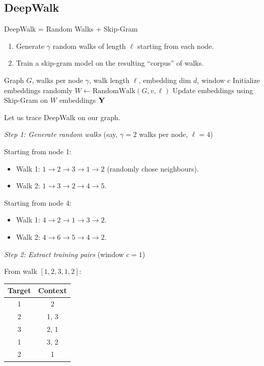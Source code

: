 \begin{notechapter}
\subsection{DeepWalk}

\begin{definition}[DeepWalk]
DeepWalk = Random Walks + Skip-Gram
\begin{enumerate}
    \item Generate $\gamma$ random walks of length $\ell$ starting from each node.
    \item Train a skip-gram model on the resulting ``corpus'' of walks.
\end{enumerate}
\end{definition}

\begin{algorithm}
\caption{DeepWalk}
\begin{algorithmic}[1]
\Require Graph $G$, walks per node $\gamma$, walk length $\ell$, embedding dim $d$, window $c$
\State Initialize embeddings randomly
        \State $W \gets \text{RandomWalk}(G, v, \ell)$ 
        \State Update embeddings using Skip-Gram on $W$
    \EndFor
\EndFor
\State \Return embeddings $\mathbf{Y}$
\end{algorithmic}
\end{algorithm}

\begin{example}
Let us trace DeepWalk on our graph.

\emph{Step 1: Generate random walks} (say, $\gamma=2$ walks per node, $\ell=4$)

Starting from node 1:
\begin{itemize}
    \item Walk 1: $1 \to 2 \to 3 \to 1 \to 2$ (randomly chose neighbours).
    \item Walk 2: $1 \to 3 \to 2 \to 4 \to 5$.
\end{itemize}

Starting from node 4:
\begin{itemize}
    \item Walk 1: $4 \to 2 \to 1 \to 3 \to 2$.
    \item Walk 2: $4 \to 6 \to 5 \to 4 \to 2$.
\end{itemize}

\emph{Step 2: Extract training pairs} (window $c=1$)

From walk $[1, 2, 3, 1, 2]$:
\begin{center}
\begin{tabular}{cc}
\toprule
Target & Context \\
\midrule
1 & 2 \\
2 & 1, 3 \\
3 & 2, 1 \\
1 & 3, 2 \\
2 & 1 \\
\bottomrule
\end{tabular}
\end{center}


\end{example}
\end{notechapter}
